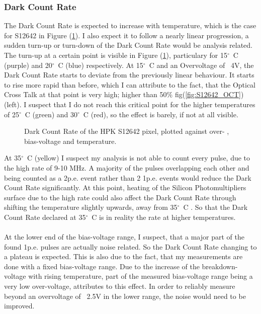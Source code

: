 \documentclass[12pt,article,type=msc,colorback,accentcolor=tud9c]{tudthesis}
\begin{document}
\subsubsection{Dark Count Rate}
The Dark Count Rate is expected to increase with temperature, which is the case for S12642 in Figure (\ref{fig:S12642_DCR}). I also expect it to follow a nearly linear progression, a sudden turn-up or turn-down of the Dark Count Rate would be analysis related. The turn-up at a certain point is visible in Figure (\ref{fig:S12642_DCR}), particulary for 15$^{\circ}$~C (purple) and 20$^{\circ}$~C (blue) respectively. At 15$^{\circ}$~C and an Overvoltage of ~4V, the Dark Count Rate starts to deviate from the previously linear behaviour. It starts to rise more rapid than before, which I can attribute to the fact, that the Optical Cross Talk at that point is very high; higher than 50$\%$  fig(\ref{fig:S12642_OCT}) (left). I suspect that I do not reach this critical point for the higher temperatures of 25$^{\circ}$~C (green) and 30$^{\circ}$~C (red), so the effect is barely, if not at all visible. 
\begin{figure}[h]
\begin{centering}
\caption{Dark Count Rate of the HPK S12642 pixel, plotted against over- , bias-voltage and temperature. }
\label{fig:S12642_DCR}
\end{centering}
\end{figure}
At 35$^{\circ}$~C (yellow) I suspect my analysis is not able to count every pulse, due to the high rate of 9-10 MHz. A majority of the pulses overlapping each other and being counted as a 2p.e. event rather than 2 1p.e. events would reduce the Dark Count Rate significantly. At this point, heating of the Silicon Photomultipliers surface due to the high rate could also affect the Dark Count Rate through shifting the temperature slightly upwards, away from 35${^\circ}$~C . So that the Dark Count Rate declared at 35${^\circ}$~C is in reality the rate at higher temperatures. \\\\
At the lower end of the bias-voltage range, I suspect, that a major part of the found 1p.e. pulses are actually noise related. So the Dark Count Rate changing to a plateau is expected. This is also due to the fact, that my measurements are done with a fixed bias-voltage range. Due to the increase of the breakdown-voltage with rising temperature, part of the measured bias-voltage range being a very low over-voltage, attributes to this effect. In order to reliably measure beyond an overvoltage of ~2.5V in the lower range, the noise would need to be improved.  
\end{document}
